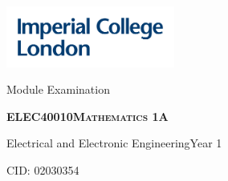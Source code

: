 \documentclass[12pt]{article}
\newcommand{\documenttype}{Module Examination}
\newcommand{\modulecode}{ELEC40010}
\newcommand{\modulename}{Mathematics 1A}
\newcommand{\cid}{02030354}
\newcommand{\degreeyear}{1}
\newcommand{\degree}{Electrical and Electronic Engineering}
\begin{document}
\thispagestyle{empty}
\includegraphics[height=2cm]{rsc/IMP_ML_1CS_4CP_CLEAR-SPACE.png}
    \vspace{4cm}
    \begin{center}
        \LARGE \documenttype
    \end{center}
    \vspace{1cm}
    \begin{center}
        \textsc{\LARGE \bfseries \modulecode \quad \modulename}
    \end{center}
    \begin{center}
        {\Large \degree \quad Year \degreeyear}
    \end{center}
    \vspace{1cm}
    \begin{center}
        {\Large CID: \cid}
    \end{center}
\end{document}
